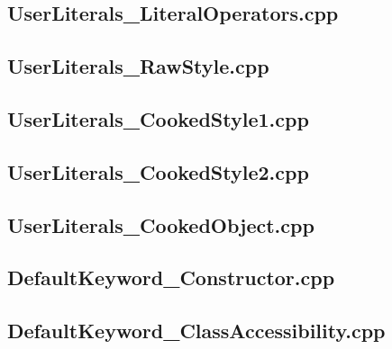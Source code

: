 \documentclass[11pt]{report}
\begin{document}
\begin{appendix}
\subsection{UserLiterals\_LiteralOperators.cpp}
\label{UserLiterals_LiteralOperators}


\subsection{UserLiterals\_RawStyle.cpp}
\label{UserLiterals_RawStyle}


\subsection{UserLiterals\_CookedStyle1.cpp}
\label{UserLiterals_CookedStyle1}


\subsection{UserLiterals\_CookedStyle2.cpp}
\label{UserLiterals_CookedStyle2}


\subsection{UserLiterals\_CookedObject.cpp}
\label{UserLiterals_CookedObject}


\subsection{DefaultKeyword\_Constructor.cpp}
\label{DefaultKeyword_Constructor}


\subsection{DefaultKeyword\_ClassAccessibility.cpp}
\label{DefaultKeyword_ClassAccessibility}



\end{appendix}
\end{document}
